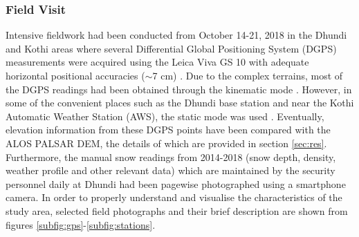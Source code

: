 \documentclass[review]{elsarticle}
\begin{document}
\subsubsection{Field Visit}
Intensive fieldwork had been conducted from October 14-21, 2018 in the Dhundi and Kothi areas where several Differential Global Positioning System (DGPS) measurements were acquired using the Leica Viva GS 10 \citep{LeicaGeosystemsAG2012} with adequate horizontal positional accuracies ($\sim$7 cm) \citep{Majumdar2019}. Due to the complex terrains, most of the DGPS readings had been obtained through the kinematic mode \citep{Luo2014}. However, in some of the convenient places such as the Dhundi base station and near the Kothi Automatic Weather Station (AWS), the static mode was used \citep{LeicaGeosystemsAG2012}. Eventually, elevation information from these DGPS points have been compared with the ALOS PALSAR DEM, the details of which are provided in section \ref{sec:res}. Furthermore, the manual snow readings from 2014-2018 (snow depth, density, weather profile and other relevant data) which are maintained by the security personnel daily at Dhundi had been pagewise photographed using a smartphone camera. In order to properly understand and visualise the characteristics of the study area, selected field photographs and their brief description are shown from figures \ref{subfig:gps}-\ref{subfig:stations}.
\end{document}
